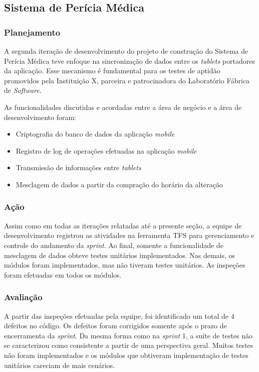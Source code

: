 \clearpage

\subsection{Sistema de Perícia Médica}

\subsubsection{Planejamento}

A segunda iteração de desenvolvimento do projeto de construção do Sistema de Perícia Médica teve enfoque na sincronização de dados entre os \textit{tablets} portadores da aplicação. Esse mecanismo é fundamental para os testes de aptidão promovidos pela Instituição X, parceira e patrocinadora do Laboratório Fábrica de \textit{Software}.

As funcionalidades discutidas e acordadas entre a área de negócio e a área de desenvolvimento foram:

\begin{itemize}
	\item Criptografia do banco de dados da aplicação \textit{mobile}
	\item Registro de log de operações efetuadas na aplicação \textit{mobile}
	\item Transmissão de informações entre \textit{tablets}
	\item Mesclagem de dados a partir da compração do horário da alteração
\end{itemize}

\subsubsection{Ação}

Assim como em todas as iterações relatadas até a presente seção, a equipe de desenvolvimento registrou as atividades na ferramenta TFS para gerenciamento e controle do andamento da \textit{sprint}. Ao final, somente a funcionalidade de mesclagem de dados obteve testes unitários implementados. Nas demais, os módulos foram implementados, mas não tiveram testes unitários. As inspeções foram efetuadas em todos os módulos.

\subsubsection{Avaliação}

A partir das inspeções efetuadas pela equipe, foi identificado um total de 4 defeitos no código. Os defeitos foram corrigidos somente após o prazo de encerramenta da \textit{sprint}. Da mesma forma como na \textit{sprint} 1, a suíte de testes não se caracterizou como consistente a partir de uma perspectiva geral. Muitos testes não foram implementados e os módulos que obtiveram implementação de testes unitários careciam de mais cenários.

